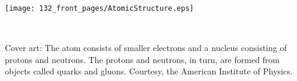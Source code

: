 \begin{center}

\texttt{[image: 132\_front\_pages/AtomicStructure.eps]}
\end{center}

\thispagestyle{empty}

\newpage

\
\setcounter{page}{2} %

\vfill

Cover art: The atom consists of smaller electrons and a nucleus consisting of protons and neutrons. The protons and neutrons, in turn, are formed from objects called quarks and gluons. Courtesy, the American Institute of Physics.

\pagebreak

